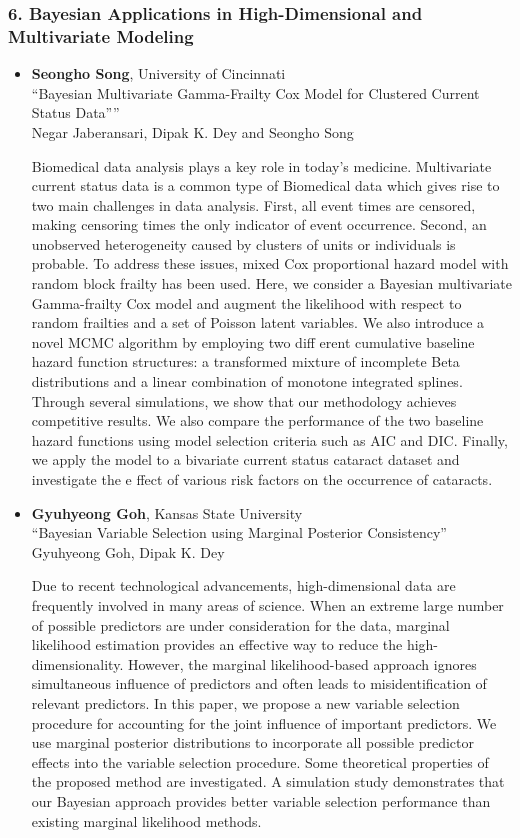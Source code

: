 \begin{itemize}
\end{itemize}

\subsubsection*{6. Bayesian Applications in High-Dimensional and Multivariate Modeling}

\begin{itemize}
\item \textbf{Seongho Song}, University of Cincinnati \\
``Bayesian Multivariate Gamma-Frailty Cox Model for Clustered Current Status Data”'' \\
Negar Jaberansari, Dipak K. Dey and Seongho Song


Biomedical data analysis plays a key role in today's medicine. Multivariate current status data is a common type of Biomedical data which gives rise to two main challenges in data analysis. First, all event times are censored, making censoring times the only indicator of event occurrence. Second, an unobserved heterogeneity caused by clusters of units or individuals is probable. To address these issues, mixed Cox proportional hazard model with random block frailty has been used. Here, we consider a Bayesian multivariate Gamma-frailty Cox model and augment the likelihood with respect to random frailties and a set of Poisson latent variables. We also introduce a novel MCMC algorithm by employing two diff erent cumulative baseline hazard function structures: a transformed mixture of incomplete Beta distributions and a linear combination of monotone integrated splines. Through several simulations, we show that our methodology achieves competitive results. We also compare the performance of the two baseline hazard functions using model selection criteria such as AIC and DIC. Finally, we apply the model to a bivariate current status cataract dataset and investigate the e ffect of various risk factors on the occurrence of
cataracts.

\item \textbf{Gyuhyeong Goh}, Kansas State University \\
``Bayesian Variable Selection using Marginal Posterior Consistency'' \\
Gyuhyeong Goh, Dipak K. Dey


Due to recent technological advancements, high-dimensional data are frequently involved in many areas of science. When an extreme large number of possible predictors are under consideration for the data, marginal likelihood estimation provides an effective way to reduce the high-dimensionality. However, the marginal likelihood-based approach ignores simultaneous influence of predictors and often leads to misidentification of relevant predictors. In this paper, we propose a new variable selection procedure for accounting for the joint influence of important predictors. We use marginal posterior distributions to incorporate all possible predictor effects into the variable selection procedure. Some theoretical properties of the proposed method are investigated. A simulation study demonstrates that our Bayesian approach provides better variable selection performance than existing marginal likelihood methods.


\end{itemize}
